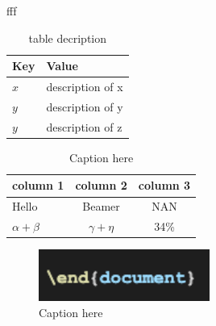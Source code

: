 \documentclass[10pt]{beamer}
\begin{document}
\begin{frame}{fff}
  \begin{table}
    \centering
    \caption{table decription}
    \label{t_sim}
    \begin{tabular}{|l|l|}
    \hline
    \textbf{Key} & \textbf{Value} \\
    \hline
    $x$ & description of x \\
    $y$ & description of y \\
    $y$ & description of z \\
    \hline
    \end{tabular}
    \end{table}

    \begin{table}[tb]
      \centering
      \caption{Caption here\label{tab:tablename}}
      \begin{tabular}{l|cc}
      \hline
      \textbf{column 1} & \textbf{column 2} & \textbf{column 3} \\ \hline
      Hello & Beamer & NAN \\ \hline
      $\alpha+\beta$ & $\gamma+\eta$ & 34\% \\ \hline
      \end{tabular}
      \end{table}

\end{frame}

\begin{frame}

  \begin{figure}[tb]
    \label{fig:figure1}
    \centering
    \includegraphics[width=0.5\textwidth]{t1.png}
    \caption{Caption here}
  \end{figure}

\end{frame}
\end{document}

